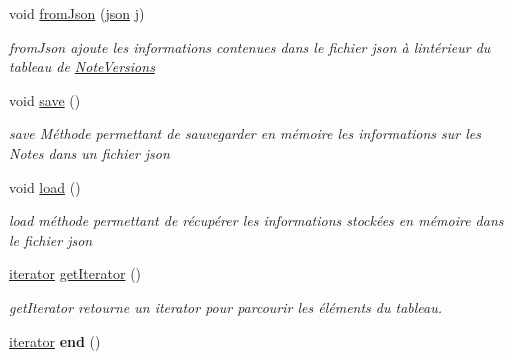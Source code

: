 \begin{DoxyCompactItemize}
void \hyperlink{classNoteManager_adc36b51fd28662048fb1f1a8b73cb61e}{from\+Json} (\hyperlink{classnlohmann_1_1basic__json}{json} j)
\begin{DoxyCompactList}\small\item\em from\+Json ajoute les informations contenues dans le fichier json à l\textquotesingle{}intérieur du tableau de \hyperlink{classNoteVersions}{Note\+Versions} \end{DoxyCompactList}\item 
\mbox{\label{classNoteManager_a51432f6bb1766fcc422250b8121cb8ba}} 
void \hyperlink{classNoteManager_a51432f6bb1766fcc422250b8121cb8ba}{save} ()
\begin{DoxyCompactList}\small\item\em save Méthode permettant de sauvegarder en mémoire les informations sur les Notes dans un fichier json \end{DoxyCompactList}\item 
\mbox{\label{classNoteManager_aa0ee3cbb998fa333b6bd3f21706f2e0c}} 
void \hyperlink{classNoteManager_aa0ee3cbb998fa333b6bd3f21706f2e0c}{load} ()
\begin{DoxyCompactList}\small\item\em load méthode permettant de récupérer les informations stockées en mémoire dans le fichier json \end{DoxyCompactList}\item 
\hyperlink{classNoteManager_1_1iterator}{iterator} \hyperlink{classNoteManager_ab61b63ebe1e10b97635ffc5c13820121}{get\+Iterator} ()
\begin{DoxyCompactList}\small\item\em get\+Iterator retourne un iterator pour parcourir les éléments du tableau. \end{DoxyCompactList}\item 
\mbox{\label{classNoteManager_acdecec90ac5cde0783b50d2e4fc4461f}} 
\hyperlink{classNoteManager_1_1iterator}{iterator} {\bfseries end} ()
\end{DoxyCompactItemize}

